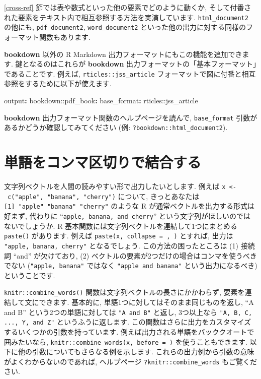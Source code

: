 \documentclass[
  11pt,
  lualatex,ja=standard,jafont=noto]{bxjsreport}
\newenvironment{Shaded}{\begin{snugshade}}{\end{snugshade}}
\newcommand{\AttributeTok}[1]{\textcolor[rgb]{0.77,0.63,0.00}{#1}}
\newcommand{\FunctionTok}[1]{\textcolor[rgb]{0.00,0.00,0.00}{#1}}
\newcommand{\KeywordTok}[1]{\textcolor[rgb]{0.13,0.29,0.53}{\textbf{#1}}}
\begin{document}
\ref{cross-ref} 節では表や数式といった他の要素でどのように動くか, そして付番された要素をテキスト内で相互参照する方法を実演しています. \texttt{html\_document2} の他にも, \texttt{pdf\_document2}, \texttt{word\_document2} といった他の出力に対する同様のフォーマット関数もあります.

\textbf{bookdown} 以外の R Markdown 出力フォーマットにもこの機能を追加できます. 鍵となるのはこれらが \textbf{bookdown} 出力フォーマットの「基本フォーマット」であることです. 例えば, \texttt{rticles::jss\_article} フォーマットで図に付番と相互参照をするために以下が使えます.

\begin{Shaded}
\begin{Highlighting}[]
\FunctionTok{output}\KeywordTok{:}
\AttributeTok{  bookdown::pdf\_book}\KeywordTok{:}\FunctionTok{}
\AttributeTok{    }\FunctionTok{base\_format}\KeywordTok{:}\AttributeTok{ rticles::jss\_article}
\end{Highlighting}
\end{Shaded}

\textbf{bookdown} 出力フォーマット関数のヘルプページを読んで, \texttt{base\_format} 引数があるかどうか確認してみてください (例: \texttt{?bookdown::html\_document2}).

\hypertarget{combine-words}{%
\section{単語をコンマ区切りで結合する}\label{combine-words}}

文字列ベクトルを人間の読みやすい形で出力したいとします. 例えば \texttt{x \textless{}-\ c("apple",\ "banana",\ "cherry")} について, きっとあなたは \texttt{{[}1{]}\ "apple"\ "banana"\ "cherry"} のような R が通常ベクトルを出力する形式は好まず, 代わりに ``\texttt{apple, banana, and cherry}'' という文字列がほしいのではないでしょうか. R 基本関数には文字列ベクトルを連結して1つにまとめる \texttt{paste()} があります. 例えば \texttt{paste(x, collapse = \textquotesingle{},\ \textquotesingle{})} とすれば, 出力は \texttt{"apple, banana, cherry"} となるでしょう. この方法の困ったところは (1) 接続詞 ``and'' が欠けており, (2) ベクトルの要素が2つだけの場合はコンマを使うべきでない (\texttt{"apple, banana"} ではなく \texttt{"apple and banana"} という出力になるべき) ということです.

\texttt{knitr::combine\_words()} 関数は文字列ベクトルの長さにかかわらず, 要素を連結して文にできます. 基本的に, 単語1つに対してはそのまま同じものを返し, ``A and B'' という2つの単語に対しては \texttt{"A and B"} と返し, 3つ以上なら \texttt{"A, B, C, ..., Y, and Z"} というふうに返します. この関数はさらに出力をカスタマイズするいくつかの引数を持っています. 例えば出力される単語をバッククオートで囲みたいなら, \texttt{knitr::combine\_words(x, before = \textquotesingle{}\textasciigrave{}\textquotesingle{})} を使うこともできます. 以下に他の引数についてもさらなる例を示します. これらの出力例から引数の意味がよくわからないのであれば, ヘルプページ \texttt{?knitr::combine\_words} もご覧ください.
\end{document}
